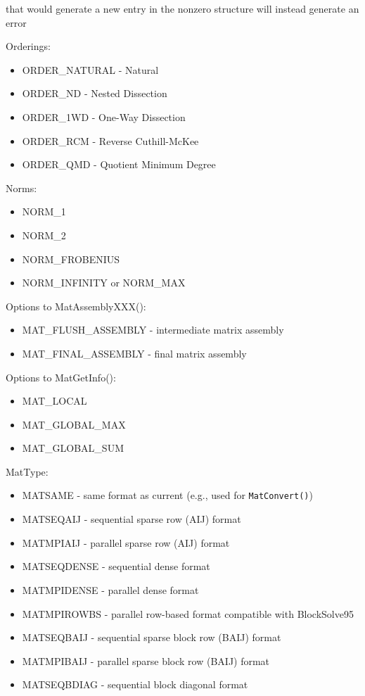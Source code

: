 {\begin{itemize}
   that would generate a new entry in the nonzero structure will instead generate
   an error
\end{itemize}
Orderings:
\begin{itemize}
\item ORDER\_NATURAL - Natural
\item ORDER\_ND - Nested Dissection
\item ORDER\_1WD - One-Way Dissection 
\item ORDER\_RCM - Reverse Cuthill-McKee
\item ORDER\_QMD - Quotient Minimum Degree
\end{itemize}
Norms:
\begin{itemize}
\item NORM\_1
\item NORM\_2
\item NORM\_FROBENIUS
\item NORM\_INFINITY or NORM\_MAX  
\end{itemize}
Options to MatAssemblyXXX():
\begin{itemize}
\item MAT\_FLUSH\_ASSEMBLY - intermediate matrix assembly
\item MAT\_FINAL\_ASSEMBLY - final matrix assembly
\end{itemize}
Options to MatGetInfo():
\begin{itemize}
\item MAT\_LOCAL
\item MAT\_GLOBAL\_MAX
\item MAT\_GLOBAL\_SUM
\end{itemize}
MatType:
\begin{itemize}
\item MATSAME - same format as current (e.g., used for {\tt MatConvert()})
\item MATSEQAIJ - sequential sparse row (AIJ) format
\item MATMPIAIJ - parallel sparse row (AIJ) format
\item MATSEQDENSE - sequential dense format
\item MATMPIDENSE - parallel dense format
\item MATMPIROWBS - parallel row-based format compatible with BlockSolve95
\item MATSEQBAIJ - sequential sparse block row (BAIJ) format
\item MATMPIBAIJ - parallel sparse block row (BAIJ) format
\item MATSEQBDIAG - sequential block diagonal format

\end{itemize}}
